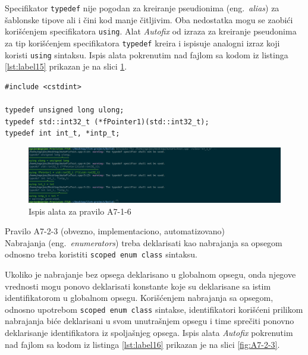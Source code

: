\documentclass[12pt,oneside]{memoir}
\begin{document}
Specifikator \texttt{typedef} nije pogodan za kreiranje pseudionima (eng.~\textit{alias}) za \v{s}ablonske tipove ali i \v{c}ini kod manje \v{c}itljivim.
Oba nedostatka mogu se zaobi\'{c}i kori\v{s}\'{c}enjem specifikatora \texttt{using}. Alat \textit{Autofix} od izraza za kreiranje pseudonima za tip kori\v{s}\'{c}enjem
specifikatora \texttt{typedef} kreira i ispisuje analogni izraz koji koristi \texttt{using} sintaksu. Ispis alata pokrenutim nad fajlom sa kodom iz listinga \ref{lst:label15} prikazan je na slici \ref{fig:A7-1-6}. \\

\begin{lstlisting}[style=customc, caption={Primer koda koji nije napisan u skladu sa pravilom A7-1-6}, label=lst:label15, captionpos=b]
#include <cstdint>

typedef unsigned long ulong;
typedef std::int32_t (*fPointer1)(std::int32_t);
typedef int int_t, *intp_t;

\end{lstlisting}

\begin{figure}[!h]
\begin{center}
\includegraphics[scale=0.3]{A7-1-6.png}
\end{center}
\caption{Ispis alata za pravilo A7-1-6}
\label{fig:A7-1-6}
\end{figure}


\begin{primer}
Pravilo A7-2-3 (obvezno, implementaciono, automatizovano) \\
Nabrajanja (eng.~\textit{enumerators}) treba deklarisati kao nabrajanja sa opsegom odnosno treba koristiti \texttt{scoped enum class} sintaksu.
\end{primer}

Ukoliko je nabrajanje bez opsega deklarisano u globalnom opsegu, onda njegove vrednosti mogu ponovo deklarisati konstante koje su deklarisane sa istim identifikatorom u globalnom opsegu. Kori\v{s}\'{c}enjem nabrajanja sa opsegom, odnosno upotrebom \texttt{scoped enum class} sintakse, identifikatori kori\v{s}\'{c}eni prilikom
nabrajanja bi\'{c}e deklarisani u svom unutra\v{s}njem opsegu i time spre\v{c}iti ponovno deklarisanje identifikatora iz spolja\v{s}njeg opsega. 
Ispis alata \textit{Autofix} pokrenutim nad fajlom sa kodom iz listinga \ref{lst:label16} prikazan je na slici \ref{fig:A7-2-3}. \\
\end{document}
